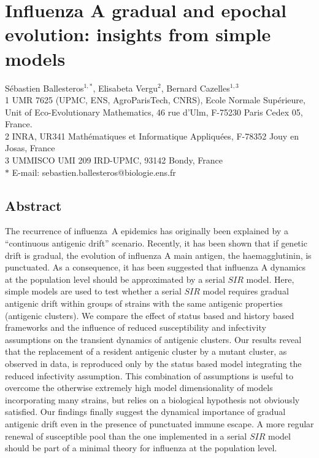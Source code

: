 \chapter{Influenza A gradual and epochal evolution: insights from  simple models}

Sébastien Ballesteros$^{1,\ast}$, 
Elisabeta Vergu$^{2}$, 
Bernard Cazelles$^{1,3}$
\\
1 UMR 7625  (UPMC, ENS, AgroParisTech, CNRS), Ecole Normale Supérieure, Unit of Eco-Evolutionary Mathematics,  46 rue d'Ulm, F-75230 Paris Cedex 05, France.
\\
2 INRA, UR341 Mathématiques et Informatique Appliquées, F-78352 Jouy en Josas, France
\\
3 UMMISCO UMI 209 IRD-UPMC, 93142 Bondy, France
\\
$\ast$ E-mail: sebastien.ballesteros@biologie.ens.fr


\section*{Abstract}

The recurrence of influenza~A epidemics has originally been explained
by a ``continuous antigenic drift'' scenario. Recently, it has been
shown that if genetic drift is gradual, the evolution of influenza A
main antigen, the haemagglutinin, is punctuated. As a consequence, it
has been suggested that influenza A dynamics at the population level
should be approximated by a serial $SIR$ model.
Here, simple models are used to test whether a serial $SIR$ model
requires gradual antigenic drift within groups of strains with the
same antigenic properties (antigenic clusters). We compare the effect
of status based and history based frameworks and the influence of
reduced susceptibility and infectivity assumptions on the transient
dynamics of antigenic clusters.
Our results reveal that the replacement of a resident antigenic
cluster by a mutant cluster, as observed in data, is reproduced only
by the status based model integrating the reduced infectivity
assumption. This combination of assumptions is useful to overcome the
otherwise extremely high model dimensionality of models incorporating
many strains, but relies on a biological hypothesis not obviously
satisfied. Our findings finally suggest the dynamical importance of
gradual antigenic drift even in the presence of punctuated immune
escape. A more regular renewal of susceptible pool than the one
implemented in a serial $SIR$ model should be part of a minimal theory
for influenza at the population level.


